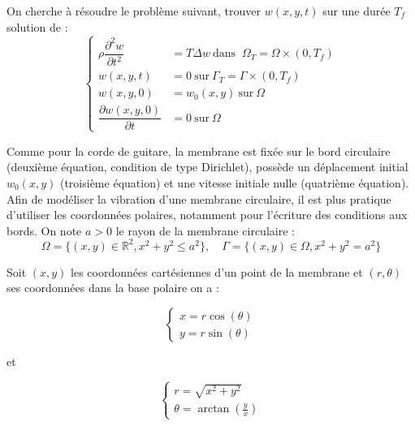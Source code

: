 \documentclass[a4,12pt]{article}
\newcommand{\R}{\mathbb{R}}
\begin{document}
On cherche à résoudre le problème suivant, trouver $w(x,y,t)$ sur une durée $T_f$ solution de :
\begin{equation}
\left\{
\begin{array}{rl}
\rho \dfrac{\partial^2 w}{\partial t^2} & =  T \Delta w ~\textrm{dans } ~ \Omega_T = \Omega \times (0,T_f)\\ 
w(x,y,t)& =  0 ~\textrm{sur} ~ \Gamma_T=\Gamma \times (0,T_f)\\
w(x,y,0)& = w_0(x,y) ~ \textrm{sur} ~\Omega \\
\dfrac{\partial w(x,y,0)}{\partial t} & = 0 ~\textrm{sur} ~\Omega 
\end{array}
\right.
\label{eq:membranemodel}
\end{equation}

Comme pour la corde de guitare, la membrane est fixée sur le bord circulaire (deuxième équation, condition de type Dirichlet), possède un déplacement initial $w_0(x,y)$ (troisième équation) et une vitesse initiale nulle (quatrième équation). Afin de modéliser la vibration d'une membrane circulaire, il est plus pratique d'utiliser les coordonnées polaires, notamment pour l'écriture des conditions aux bords. On note $a>0$ le rayon de la membrane circulaire : 
\[
\Omega=\{(x,y)\in \R^2, x^2+y^2 \leq a^2\}, \quad \Gamma=\{(x,y)\in \Omega,  x^2+y^2 = a^2\}
\]

Soit $(x,y)$ les coordonnées cartésiennes d'un point de la membrane et $(r,\theta)$ ses coordonnées dans la base polaire on a :
\begin{center}
	\begin{minipage}[l]{.9\linewidth}
	
	\begin{minipage}[l]{.4\linewidth}
	\begin{equation*} 
	\left\{ 
	\begin{array}{rcl}
		x=r\cos(\theta) \\
		y=r\sin(\theta)
	\end{array} 
	\right.
	\end{equation*}
 	\end{minipage}
 et
	\begin{minipage}[r]{.4\linewidth}
	 \begin{equation*} 
	 \left\{ 
	 \begin{array}{rcl}
		r=\sqrt{x^2+y^2} \\
		\theta=\arctan(\frac{y}{x})
	\end{array} 
	\right.
	\end{equation*}
	 \end{minipage}

	 \end{minipage}
\end{center}
\end{document}
